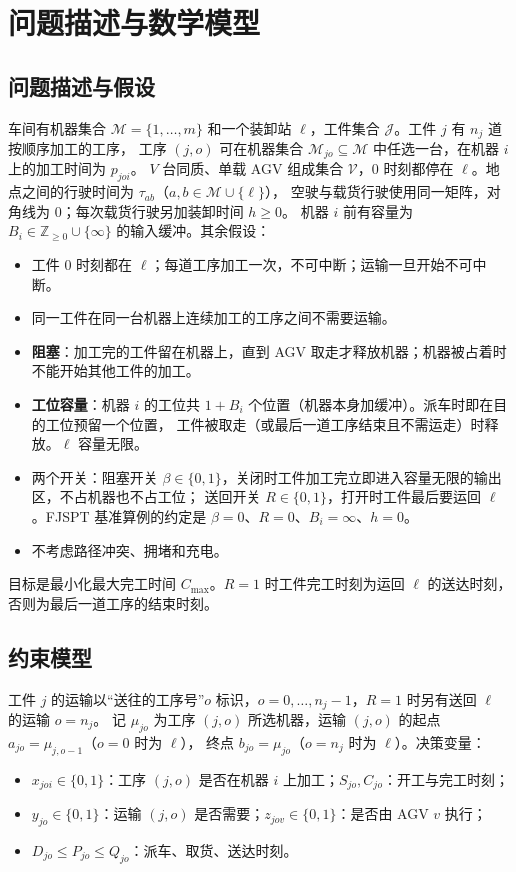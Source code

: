 \documentclass[11pt,a4paper]{ctexart}
\theoremstyle{definition}
\theoremstyle{remark}
\newcommand{\cJ}{\mathcal{J}}
\newcommand{\cM}{\mathcal{M}}
\newcommand{\cV}{\mathcal{V}}
\newcommand{\LU}{\ell}
\begin{document}
\section{问题描述与数学模型}

\subsection{问题描述与假设}

车间有机器集合 $\cM=\{1,\dots,m\}$ 和一个装卸站 $\LU$，工件集合 $\cJ$。工件 $j$ 有 $n_j$ 道按顺序加工的工序，
工序 $(j,o)$ 可在机器集合 $\cM_{jo}\subseteq\cM$ 中任选一台，在机器 $i$ 上的加工时间为 $p_{joi}$。
$V$ 台同质、单载 AGV 组成集合 $\cV$，0 时刻都停在 $\LU$。地点之间的行驶时间为 $\tau_{ab}$（$a,b\in\cM\cup\{\LU\}$），
空驶与载货行驶使用同一矩阵，对角线为 0；每次载货行驶另加装卸时间 $h\ge 0$。
机器 $i$ 前有容量为 $B_i\in\mathbb{Z}_{\ge 0}\cup\{\infty\}$ 的输入缓冲。其余假设：
\begin{itemize}[nosep]
  \item 工件 0 时刻都在 $\LU$；每道工序加工一次，不可中断；运输一旦开始不可中断。
  \item 同一工件在同一台机器上连续加工的工序之间不需要运输。
  \item \textbf{阻塞}：加工完的工件留在机器上，直到 AGV 取走才释放机器；机器被占着时不能开始其他工件的加工。
  \item \textbf{工位容量}：机器 $i$ 的工位共 $1+B_i$ 个位置（机器本身加缓冲）。派车时即在目的工位预留一个位置，
        工件被取走（或最后一道工序结束且不需运走）时释放。$\LU$ 容量无限。
  \item 两个开关：阻塞开关 $\beta\in\{0,1\}$，关闭时工件加工完立即进入容量无限的输出区，不占机器也不占工位；
        送回开关 $R\in\{0,1\}$，打开时工件最后要运回 $\LU$。FJSPT 基准算例的约定是 $\beta=0$、$R=0$、$B_i=\infty$、$h=0$。
  \item 不考虑路径冲突、拥堵和充电。
\end{itemize}
目标是最小化最大完工时间 $C_{\max}$。$R=1$ 时工件完工时刻为运回 $\LU$ 的送达时刻，否则为最后一道工序的结束时刻。

\subsection{约束模型}

工件 $j$ 的运输以“送往的工序号”$o$ 标识，$o=0,\dots,n_j-1$，$R=1$ 时另有送回 $\LU$ 的运输 $o=n_j$。
记 $\mu_{jo}$ 为工序 $(j,o)$ 所选机器，运输 $(j,o)$ 的起点 $a_{jo}=\mu_{j,o-1}$（$o=0$ 时为 $\LU$），
终点 $b_{jo}=\mu_{jo}$（$o=n_j$ 时为 $\LU$）。决策变量：
\begin{itemize}[nosep]
  \item $x_{joi}\in\{0,1\}$：工序 $(j,o)$ 是否在机器 $i$ 上加工；$S_{jo},C_{jo}$：开工与完工时刻；
  \item $y_{jo}\in\{0,1\}$：运输 $(j,o)$ 是否需要；$z_{jov}\in\{0,1\}$：是否由 AGV $v$ 执行；
  \item $D_{jo}\le P_{jo}\le Q_{jo}$：派车、取货、送达时刻。
\end{itemize}
\end{document}
